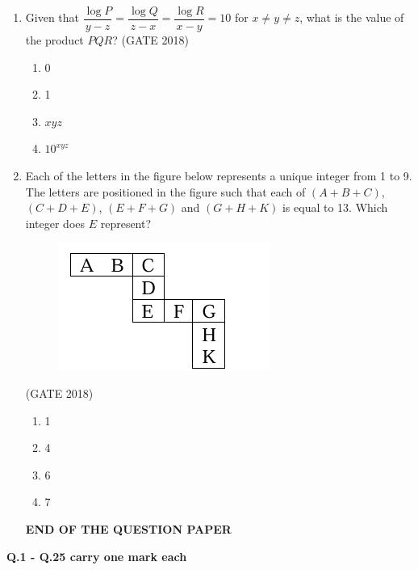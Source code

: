 \documentclass[journal,12pt,onecolumn]{IEEEtran}
\theoremstyle{remark}
\begin{document}
\begin{enumerate}
\item Given that $\dfrac{\log P}{y-z} = \dfrac{\log Q}{z-x} = \dfrac{\log R}{x-y} = 10$ for $x \neq y \neq z$, what is the value of the product $PQR$?
\hfill{(GATE 2018)}
\begin{multicols}{4}
\begin{enumerate}
    \item 0
    \item 1
    \item $xyz$
    \item $10^{xyz}$
\end{enumerate}
\end{multicols}
\vspace{1cm}
\newpage
\item Each of the letters in the figure below represents a unique integer from 1 to 9. The letters are positioned in the figure such that each of $(A+B+C)$, $(C+D+E)$, $(E+F+G)$ and $(G+H+K)$ is equal to 13. Which integer does $E$ represent?
\begin{figure}
    \centering
    \includegraphics[width=0.5\linewidth]{GATE-CE-2018/10A-2.png}
    \caption{}
    \label{10a-2}
\end{figure}
\hfill{(GATE 2018)}
\begin{multicols}{4}
\begin{enumerate}
    \item 1
    \item 4
    \item 6
    \item 7
\end{enumerate}
\end{multicols}
\vspace{5cm}
\begin{center}
   \textbf{\large END OF THE QUESTION PAPER} 
\end{center}







    
\end{enumerate}
\newpage
\textbf{\large Q.1 - Q.25 carry one mark each}
\end{document}
